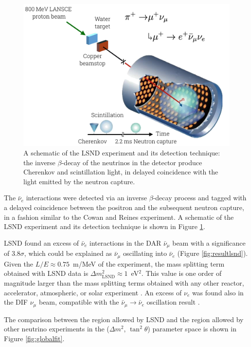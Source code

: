 \begin{figure}[htbp]
    \centering
    \includegraphics[width=0.9\linewidth]{figures/lsnd_exp.png}
    \caption{A schematic of the LSND experiment and its detection technique: the inverse $\beta$-decay of the neutrinos in the detector produce Cherenkov and scintillation light, in delayed coincidence with the light emitted by the neutron capture.}
    \label{fig:lsnd_exp}
\end{figure}

The $\bar{\nu}_e$ interactions were detected via an inverse $\beta$-decay process and tagged with a delayed coincidence between the positron and the subsequent neutron capture, in a fashion similar to the Cowan and Reines experiment. A schematic of the LSND experiment and its detection technique is shown in Figure \ref{fig:lsnd_exp}.

LSND found an excess of $\bar{\nu}_e$ interactions in the DAR $\bar{\nu}_{\mu}$ beam with a significance of $3.8\sigma$, which could be explained as $\bar{\nu}_\mu$ oscillating into $\bar{\nu}_e$ (Figure \ref{fig:resultlsnd}). Given the $L/E\approx0.75$~m/MeV of the experiment, the mass splitting term obtained with LSND data is $\Delta m_{\mathrm{LSND}}^2\approx1$~eV$^2$. This value is one order of magnitude larger than the mass splitting terms obtained with any other reactor, accelerator, atmospheric, or solar experiment \cite{Aguilar:2001ty}.  An excess of $\nu_{e}$ was found also in the DIF $\nu_{\mu}$ beam, compatible with the $\bar{\nu}_\mu \rightarrow \bar{\nu}_e$ oscillation result \cite{Athanassopoulos:1997pv}. 
\begin{mccorrection}
The comparison between the region allowed by LSND and the region allowed by other neutrino experiments in the ($\Delta m^2$, $\tan^2\theta$) parameter space is shown in Figure \ref{fig:globalfit}.
\end{mccorrection}

